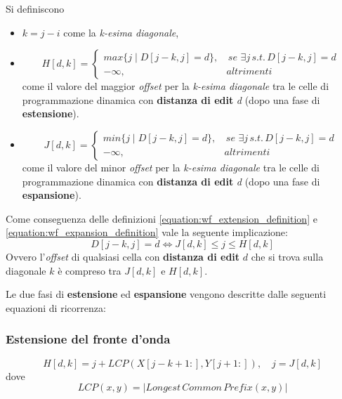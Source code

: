     Si definiscono
    \begin{itemize}
        \item $k = j - i$ come la \emph{k-esima diagonale},
        \item \begin{equation}
            H[d, k] = \begin{cases}
                max\{j \mid D[j - k, j] = d\}, & \, se \, \, \exists j \, s.t. \, D[j - k, j] = d \\
                -\infty, & altrimenti
            \end{cases}
        \label{equation:wf_extension_definition}
        \end{equation}
        come il valore del maggior \emph{offset} per la \emph{k-esima diagonale} tra le celle di programmazione dinamica con \textbf{distanza di edit} \emph{d} (dopo una fase di \textbf{estensione}).
        \item \begin{equation}
            J[d, k] = \begin{cases}
                min\{j \mid D[j - k, j] = d\}, & \, se \, \, \exists j \, s.t. \, D[j - k, j] = d \\
                -\infty, & altrimenti
            \end{cases}
        \label{equation:wf_expansion_definition}
        \end{equation}
        come il valore del minor \emph{offset} per la \emph{k-esima diagonale} tra le celle di programmazione dinamica con \textbf{distanza di edit} \emph{d} (dopo una fase di \textbf{espansione}).
    \end{itemize}
    Come conseguenza delle definizioni \ref{equation:wf_extension_definition} e \ref{equation:wf_expansion_definition} vale la seguente implicazione:
    \begin{equation*}
        D[j-k, j] = d \iff J[d,k] \leq j \leq H[d,k]
    \end{equation*}
    Ovvero l'\emph{offset} di qualsiasi cella con \textbf{distanza di edit} $d$ che si trova sulla diagonale $k$ è compreso tra  $J[d,k]$ e $H[d,k]$.
    
    Le due fasi di \textbf{estensione} ed \textbf{espansione} vengono descritte dalle seguenti equazioni di ricorrenza:
\subsubsection{Estensione del fronte d'onda}
    \begin{equation}
        H[d,k] = j + LCP(X[j - k + 1:], Y[j + 1:]), \quad j = J[d,k]
    \label{equation:wf-extension}
    \end{equation}
    dove
    $$LCP(x, y) = \lvert Longest \, Common \, Prefix(x, y) \rvert$$

